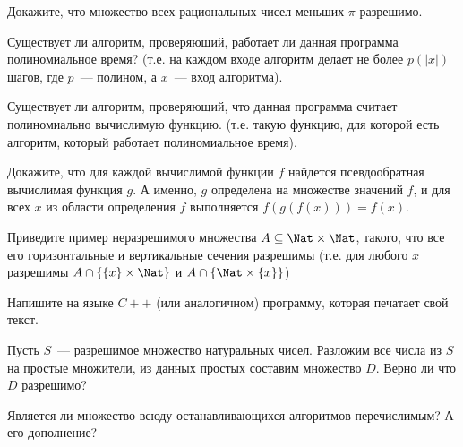 \setcounter{curtask}{9}


\begin{task}
    Докажите, что множество всех рациональных чисел меньших $\pi$ разрешимо.
\end{task}

\begin{task}
    Существует ли алгоритм, проверяющий, работает ли данная программа
    полиномиальное время? (т.е. на каждом входе алгоритм делает не более $p(|x|)$
    шагов, где $p$~--- полином, а $x$~--- вход алгоритма).
\end{task}

\begin{task}
    Существует ли алгоритм, проверяющий, что данная программа считает полиномиально
    вычислимую функцию. (т.е. такую функцию, для которой есть алгоритм, который
    работает полиномиальное время).
\end{task}

\begin{task}
    Докажите, что для каждой вычислимой функции $f$ найдется
    псевдообратная вычислимая функция $g$. А именно, $g$ определена на
    множестве значений $f$, и для всех $x$ из области определения $f$
    выполняется $f(g(f(x))) = f(x)$.
\end{task}

\begin{task}
    Приведите пример неразрешимого множества $A \subseteq \Nat \times \Nat$,
    такого, что все его горизонтальные и вертикальные сечения
    разрешимы (т.е. для любого $x$ разрешимы $A \cap \{\{x\} \times \Nat\}$
    и $A \cap \{\Nat \times \{x\}\}$)
\end{task}

\begin{task}
    Напишите на языке $C++$ (или аналогичном) программу, которая
    печатает свой текст.
\end{task}

\begin{task}
    Пусть $S$~--- разрешимое множество натуральных чисел. Разложим все
    числа из $S$ на простые множители, из данных простых составим
    множество $D$. Верно ли что $D$ разрешимо?
\end{task}



\breakline


\begin{task}
    Является ли множество всюду останавливающихся алгоритмов перечислимым? А его
    дополнение?
\end{task}

